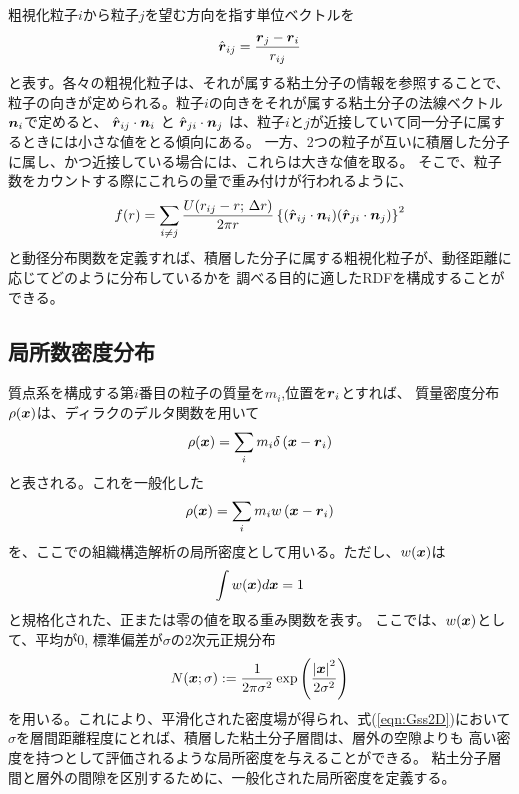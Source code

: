 粗視化粒子$i$から粒子$j$を望む方向を指す単位ベクトルを
\begin{equation}
	\hat{\mbox{\boldmath $r$}}_{ij}=\frac{\mbox{\boldmath $r$}_j-\mbox{\boldmath $r$}_i}{r_{ij}}
	\label{eqn:rhat}
\end{equation}
と表す。各々の粗視化粒子は、それが属する粘土分子の情報を参照することで、
粒子の向きが定められる。粒子$i$の向きをそれが属する粘土分子の法線ベクトル$\mbox{\boldmath $n$}_i$で定めると、
$\hat{\mbox{\boldmath $r$}}_{ij}\cdot\mbox{\boldmath $n$}_i$
と
$\hat{\mbox{\boldmath $r$}}_{ji}\cdot\mbox{\boldmath $n$}_j$
は、粒子$i$と$j$が近接していて同一分子に属するときには小さな値をとる傾向にある。
一方、2つの粒子が互いに積層した分子に属し、かつ近接している場合には、これらは大きな値を取る。
そこで、粒子数をカウントする際にこれらの量で重み付けが行われるように、
\begin{equation}
	f(r)=
	\sum_{i\neq j} \frac{U(r_{ij}-r;\, \Delta r)}{2\pi r}
	\left\{
		(\hat{\mbox{\boldmath $r$}}_{ij} \cdot \mbox{\boldmath $n$}_i)
		(\hat{\mbox{\boldmath $r$}}_{ji} \cdot \mbox{\boldmath $n$}_j)
	\right\}^2
	\label{eqn:RDFn}
\end{equation}
と動径分布関数を定義すれば、積層した分子に属する粗視化粒子が、動径距離に応じてどのように分布しているかを
調べる目的に適したRDFを構成することができる。
\subsection{局所数密度分布}
質点系を構成する第$i$番目の粒子の質量を$m_i$,位置を$\mbox{\boldmath $r$}_i$とすれば、
質量密度分布$\rho(\mbox{\boldmath $x$})$は、ディラクのデルタ関数を用いて
\begin{equation}
	\rho(\mbox{\boldmath $x$})=\sum_{i} m_i\delta\left(\mbox{\boldmath $x$}-\mbox{\boldmath $r$}_i\right)
\end{equation}
と表される。これを一般化した
\begin{equation}
	\rho(\mbox{\boldmath $x$})=\sum_{i} m_i w\left(\mbox{\boldmath $x$}-\mbox{\boldmath $r$}_i\right)
	\label{eqn:rhox_gen}
\end{equation}
を、ここでの組織構造解析の局所密度として用いる。ただし、$w(\mbox{\boldmath $x$})$は
\begin{equation}
	\int w(\mbox{\boldmath $x$}) d\mbox{\boldmath $x$} =1
\end{equation}
と規格化された、正または零の値を取る重み関数を表す。
ここでは、$w(\mbox{\boldmath $x$})$として、平均が0, 標準偏差が$\sigma$の2次元正規分布
\begin{equation}
	N(\mbox{\boldmath $x$};\sigma):=
	\frac{1}{2\pi\sigma^2}
	\exp\left(
		\frac{\left|\mbox{\boldmath $x$}\right|^2}{2\sigma^2}
	\right)
	\label{eqn:Gss2D}
\end{equation}
を用いる。これにより、平滑化された密度場が得られ、式(\ref{eqn:Gss2D})において
$\sigma$を層間距離程度にとれば、積層した粘土分子層間は、層外の空隙よりも
高い密度を持つとして評価されるような局所密度を与えることができる。
粘土分子層間と層外の間隙を区別するために、一般化された局所密度を定義する。
